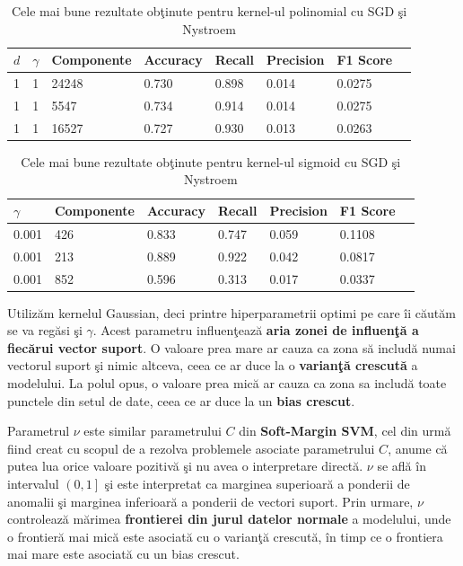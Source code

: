 \begin{table}[H]
    \centering
    \begin{tabularx}{\textwidth}{
        |X
        |X
        |X
        |X
        |X
        |X
        |X
        |X|
    }
    \hline
    $d$ & $\gamma$ & {Componente} & {Accuracy} & {Recall} & {Precision} & {F1 Score} \\
    \hline
    1 & 1 & 24248 & 0.730 & 0.898 & 0.014 & 0.0275 \\
    \rowcolor{gray!20} 1 &  1 & 5547 & 0.734	& 0.914	& 0.014	& 0.0275 \\ 
    1 & 1 & 16527 & 0.727 & 0.930 & 0.013 & 0.0263 \\ 
    \hline
  \end{tabularx}
  \caption{Cele mai bune rezultate obţinute pentru kernel-ul polinomial cu SGD şi Nystroem}
\end{table}

\begin{table}[H]
    \centering
    \begin{tabularx}{\textwidth}{
        |X
        |X
        |X
        |X
        |X
        |X
        |X|
    }
    \hline
    $\gamma$ & {Componente} & {Accuracy} & {Recall} & {Precision} & {F1 Score} \\
    \hline
     0.001 & 426 & 0.833 & 0.747 & 0.059 & 0.1108 \\
     \rowcolor{gray!20} 0.001 & 213 & 0.889 & 0.922 & 0.042	& 0.0817 \\
    0.001 & 852	& 0.596 & 0.313 & 0.017	& 0.0337 \\
    \hline
  \end{tabularx}
  \caption{Cele mai bune rezultate obţinute pentru kernel-ul sigmoid cu SGD şi Nystroem}
\end{table}

Utilizăm kernelul Gaussian, deci printre hiperparametrii optimi pe care îi căutăm 
se va regăsi şi $\gamma$. Acest parametru influenţează 
\textbf{aria zonei de influenţă a 
fiecărui vector suport}. O valoare prea mare ar cauza ca zona să includă numai 
vectorul suport şi nimic altceva, ceea ce ar duce la o \textbf{varianţă crescută} 
a modelului. La polul opus, o valoare prea mică ar cauza ca zona sa includă 
toate punctele din setul de date, ceea ce ar duce la un \textbf{bias crescut}.

Parametrul $\nu$ este similar parametrului $C$ din \textbf{Soft-Margin SVM}, 
cel din urmă
fiind creat cu scopul de a rezolva problemele asociate parametrului $C$, anume că 
putea lua orice valoare pozitivă şi nu avea o interpretare directă. $\nu$ se află 
în intervalul $\left(0, 1\right]$ şi este interpretat ca marginea superioară a ponderii de anomalii 
şi marginea inferioară a ponderii de vectori suport. Prin urmare, $\nu$ controlează
mărimea \textbf{frontierei din jurul datelor normale} a modelului, 
unde o frontieră mai mică este asociată
cu o varianţă crescută, în timp ce o frontiera mai mare este asociată cu un bias 
crescut.

